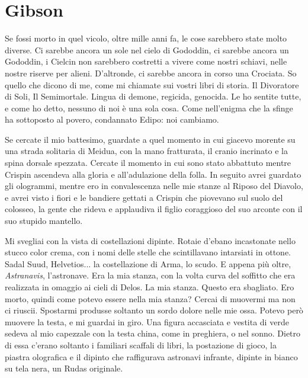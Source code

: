 \chapter{Gibson}

Se fossi morto in quel vicolo, oltre mille anni fa, le cose sarebbero
state molto diverse. Ci sarebbe ancora un sole nel cielo di Gododdin, ci
sarebbe ancora un Gododdin, i Cielcin non sarebbero costretti a vivere
come nostri schiavi, nelle nostre riserve per alieni. D'altronde, ci
sarebbe ancora in corso una Crociata. So quello che dicono di me, come
mi chiamate sui vostri libri di storia. Il Divoratore di Soli, Il
Semimortale. Lingua di demone, regicida, genocida. Le ho sentite tutte,
e come ho detto, nessuno di noi è una sola cosa. Come nell'enigma che la
sfinge ha sottoposto al povero, condannato Edipo: noi cambiamo.

Se cercate il mio battesimo, guardate a quel momento in cui giacevo
morente su una strada solitaria di Meidua, con la mano fratturata, il
cranio incrinato e la spina dorsale spezzata. Cercate il momento in cui
sono stato abbattuto mentre Crispin ascendeva alla gloria e
all'adulazione della folla. In seguito avrei guardato gli ologrammi,
mentre ero in convalescenza nelle mie stanze al Riposo del Diavolo, e
avrei visto i fiori e le bandiere gettati a Crispin che piovevano sul
suolo del colosseo, la gente che rideva e applaudiva il figlio
coraggioso del suo arconte con il suo stupido mantello.

\begin{figure}
	\centering
	\def\svgwidth{\columnwidth}
	\scalebox{0.2}{}
\end{figure}

Mi svegliai con la vista di costellazioni dipinte. Rotaie d'ebano
incastonate nello stucco color crema, con i nomi delle stelle che
scintillavano intarsiati in ottone. Sadal Suud, Helvetios... la
costellazione di Arma, lo scudo. E appena più oltre, \emph{Astranavis},
l'astronave. Era la mia stanza, con la volta curva del soffitto che era
realizzata in omaggio ai cieli di Delos. La mia stanza. Questo era
sbagliato. Ero morto, quindi come potevo essere nella mia stanza? Cercai
di muovermi ma non ci riuscii. Spostarmi produsse soltanto un sordo
dolore nelle mie ossa. Potevo però muovere la testa, e mi guardai in
giro. Una figura accasciata e vestita di verde sedeva al mio capezzale
con la testa china, come in preghiera, o nel sonno. Dietro di essa
c'erano soltanto i familiari scaffali di libri, la postazione di gioco,
la piastra olografica e il dipinto che raffigurava astronavi infrante,
dipinte in bianco su tela nera, un Rudas originale.

